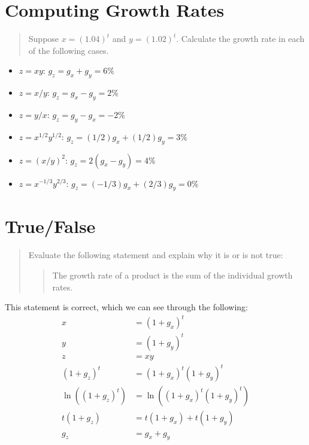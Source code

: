 \documentclass[8pt]{extarticle}
\begin{document}
\section*{Computing Growth Rates}%
  \begin{quote}
    Suppose $x = (1.04)^t$ and $y = (1.02)^t$. Calculate the growth rate in each of the following cases.
  \end{quote}
  \begin{itemize}
    \item $z = xy$: $g_z = g_x + g_y = 6\%$
    \item $z = x/y$: $g_z = g_x - g_y = 2\%$
    \item $z = y/x$: $g_z = g_y - g_x = -2\%$
    \item $z = x^{1/2}y^{1/2}$: $g_z = (1/2)g_x + (1/2)g_y = 3\%$
    \item $z = (x/y)^2$: $g_z = 2(g_x-g_y) = 4\%$
    \item $z = x^{-1/3}y^{2/3}$: $g_z = (-1/3)g_x + (2/3)g_y = 0\%$
  \end{itemize}
\section*{True/False}%
  \begin{quote}
    Evaluate the following statement and explain why it is or is not true:
      \begin{quote}
        The growth rate of a product is the sum of the individual growth rates.
      \end{quote}
  \end{quote}
This statement is correct, which we can see through the following:
  \begin{align*}
    x &= (1+g_x)^t \\
    y &= (1+g_y)^t \\
    z &= xy \\
    (1+g_z)^t &= (1+g_x)^t(1+g_y)^t \\
    \ln\left((1+g_z)^t\right) &= \ln\left((1+g_x)^t(1+g_y)^t\right)\\
    t(1+g_z) &= t(1+g_x) + t(1+g_y) \\
    g_z &= g_x + g_y
  \end{align*}
\end{document}
